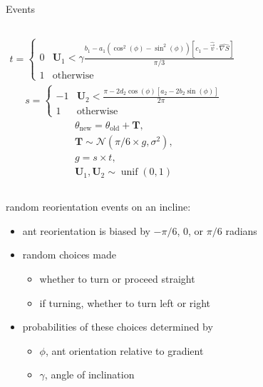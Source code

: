 \begin{frame}{Events}
\begin{columns}[T,onlytextwidth]
\small{
\begin{align*}
t =
\begin{cases}
      0 & \bm{U}_1 < \gamma\frac{b_1 - a_1(\cos^2(\phi)-\sin^2(\phi))[c_1 - \hat{\vec{v}} \cdot \hat{\nabla S}]}{\pi/3} \\
      1 & \text{otherwise}
   \end{cases}
\end{align*}
\begin{align*}
s =
\begin{cases}
      -1 & \bm{U}_2 < \frac{\pi -2 d_2 \cos(\phi) [a_2-2 b_2 \sin(\phi)]}{2 \pi } \\
      1 & \text{otherwise}
   \end{cases}
\end{align*}
}
\begin{align*}
\theta_{\operatorname{new}} = \theta_{\operatorname{old}} + \bm{T},\\
\bm{T} \sim \mathcal{N}(\pi/6 \times g,\sigma^2), \\
g = s \times t, \\
\bm{U}_1, \bm{U}_2 \sim \operatorname{unif}(0,1)
\end{align*}
\end{columns}
\alert{random reorientation events on an incline:}
\begin{itemize}
	\item ant reorientation is biased by $-\pi/6$, $0$, or $\pi/6$ radians
	 \item random choices made
     \begin{itemize}
     	\item whether to turn or proceed straight
     	\item if turning, whether to turn left or right
     \end{itemize}
     \item probabilities of these choices determined by
     \begin{itemize}
     	\item $\phi$, ant orientation relative to gradient
        \item $\gamma$, angle of inclination
     \end{itemize}
\end{itemize}
\end{frame}

